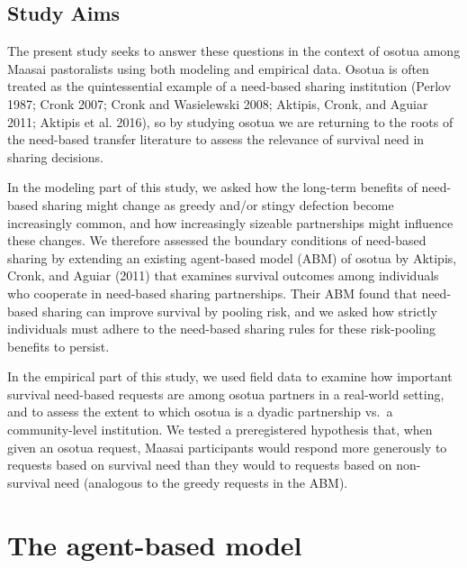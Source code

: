 \documentclass[
]{article}
\begin{document}
\subsection{Study Aims}

The present study seeks to answer these questions in the context of osotua among Maasai pastoralists using both modeling and empirical data. Osotua is often treated as the quintessential example of a need-based sharing institution (Perlov 1987; Cronk 2007; Cronk and Wasielewski 2008; Aktipis, Cronk, and Aguiar 2011; Aktipis et al. 2016), so by studying osotua we are returning to the roots of the need-based transfer literature to assess the relevance of survival need in sharing decisions.

In the modeling part of this study, we asked how the long-term benefits of need-based sharing might change as greedy and/or stingy defection become increasingly common, and how increasingly sizeable partnerships might influence these changes. We therefore assessed the boundary conditions of need-based sharing by extending an existing agent-based model (ABM) of osotua by Aktipis, Cronk, and Aguiar (2011) that examines survival outcomes among individuals who cooperate in need-based sharing partnerships. Their ABM found that need-based sharing can improve survival by pooling risk, and we asked how strictly individuals must adhere to the need-based sharing rules for these risk-pooling benefits to persist.

In the empirical part of this study, we used field data to examine how important survival need-based requests are among osotua partners in a real-world setting, and to assess the extent to which osotua is a dyadic partnership vs.~a community-level institution. We tested a preregistered hypothesis that, when given an osotua request, Maasai participants would respond more generously to requests based on survival need than they would to requests based on non-survival need (analogous to the greedy requests in the ABM).

\section{The agent-based model}
\end{document}
